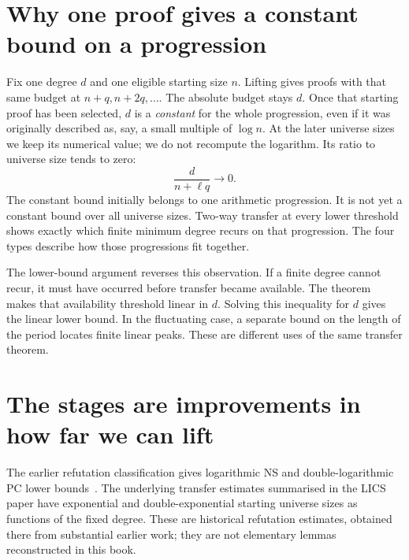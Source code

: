 \section*{Why one proof gives a constant bound on a progression}
Fix one degree $d$ and one eligible starting size $n$. Lifting gives
proofs with that same budget at $n+q,n+2q,\ldots$. The absolute budget
stays $d$. Once that starting proof has been selected, $d$ is a
\emph{constant} for the whole progression, even if it was originally
described as, say, a small multiple of $\log n$. At the later universe sizes
we keep its numerical value; we do not recompute the logarithm.
Its ratio to universe size tends to zero:
\[
                         \frac{d}{n+\ell q}\longrightarrow0.
\]
The constant bound initially belongs to one arithmetic progression.
It is not yet a constant bound over all universe sizes. Two-way transfer
at every lower threshold shows exactly which finite minimum degree
recurs on that progression. The four types describe how those
progressions fit together.

The lower-bound argument reverses this observation. If a finite degree
cannot recur, it must have occurred before transfer became available.
The theorem makes that availability threshold linear in $d$. Solving
this inequality for $d$ gives the linear lower bound. In the fluctuating
case, a separate bound on the length of the period locates finite linear
peaks. These are different uses of the same transfer theorem.

\section*{The stages are improvements in how far we can lift}
The earlier refutation classification gives logarithmic NS and
double-logarithmic PC lower bounds~\cite{Riis,RiisLong}. The underlying
transfer estimates summarised in the LICS paper have exponential and
double-exponential starting universe sizes as functions of the fixed degree.
These are historical refutation estimates, obtained there from
substantial earlier work; they are not elementary lemmas reconstructed
in this book.

